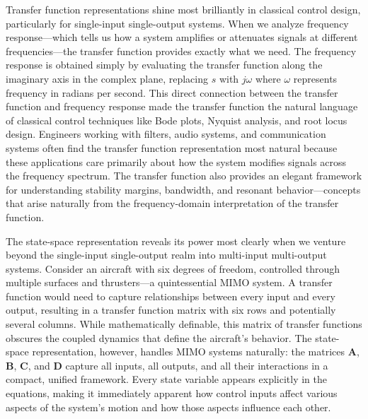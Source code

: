 Transfer function representations shine most brilliantly in classical control design, particularly for single-input single-output systems. When we analyze frequency response—which tells us how a system amplifies or attenuates signals at different frequencies—the transfer function provides exactly what we need. The frequency response is obtained simply by evaluating the transfer function along the imaginary axis in the complex plane, replacing $s$ with $j\omega$ where $\omega$ represents frequency in radians per second. This direct connection between the transfer function and frequency response made the transfer function the natural language of classical control techniques like Bode plots, Nyquist analysis, and root locus design. Engineers working with filters, audio systems, and communication systems often find the transfer function representation most natural because these applications care primarily about how the system modifies signals across the frequency spectrum. The transfer function also provides an elegant framework for understanding stability margins, bandwidth, and resonant behavior—concepts that arise naturally from the frequency-domain interpretation of the transfer function.

The state-space representation reveals its power most clearly when we venture beyond the single-input single-output realm into multi-input multi-output systems. Consider an aircraft with six degrees of freedom, controlled through multiple surfaces and thrusters—a quintessential MIMO system. A transfer function would need to capture relationships between every input and every output, resulting in a transfer function matrix with six rows and potentially several columns. While mathematically definable, this matrix of transfer functions obscures the coupled dynamics that define the aircraft's behavior. The state-space representation, however, handles MIMO systems naturally: the matrices $\mathbf{A}$, $\mathbf{B}$, $\mathbf{C}$, and $\mathbf{D}$ capture all inputs, all outputs, and all their interactions in a compact, unified framework. Every state variable appears explicitly in the equations, making it immediately apparent how control inputs affect various aspects of the system's motion and how those aspects influence each other.

